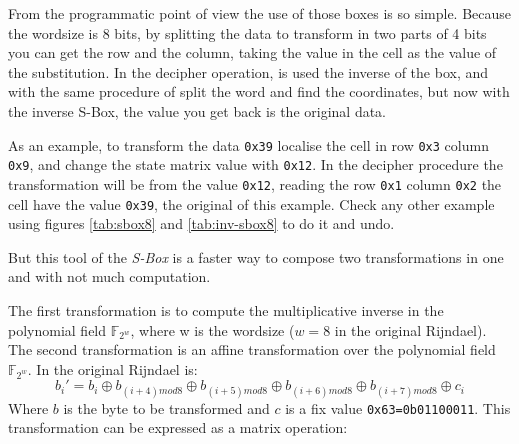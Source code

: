 \documentclass[10pt,a4paper,twoside]{llncs}
\newcommand{\Fpn}[2]{\ensuremath{\mathbb{F}_{#1^#2}}}
\begin{document}
From the programmatic point of view the use of those boxes is so simple. Because the wordsize is 8 bits, by splitting the data to transform in two parts of 4 bits you can get the row and the column, taking the value in the cell as the value of the substitution. In the decipher operation, is used the inverse of the box, and with the same procedure of split the word and find the coordinates, but now with the inverse S-Box, the value you get back is the original data.

As an example, to transform the data \texttt{0x39} localise the cell in row \texttt{0x3} column \texttt{0x9}, and change the state matrix value with \texttt{0x12}. In the decipher procedure the transformation will be from the value \texttt{0x12}, reading the row \texttt{0x1} column \texttt{0x2} the cell have the value \texttt{0x39}, the original of this example. Check any other example using figures \ref{tab:sbox8} and \ref{tab:inv-sbox8} to do it and undo.


But this tool of the \emph{S-Box} is a faster way to compose two transformations in one and with not much computation.

The first transformation is to compute the multiplicative inverse in the polynomial field \Fpn{2}{w}, where w is the wordsize ($w=8$ in the original Rijndael). The second transformation is an affine transformation over the polynomial field \Fpn{2}{w}. In the original Rijndael is:
\begin{equation}\label{eq:subBytes:affine}
 b_{i}' = b_{i} \oplus b_{(i+4)mod8} \oplus b_{(i+5)mod8} \oplus 
          b_{(i+6)mod8} \oplus b_{(i+7)mod8} \oplus c_{i}
\end{equation}
Where $b$ is the byte to be transformed and $c$ is a fix value \texttt{0x63=0b01100011}. This transformation can be expressed as a matrix operation:
\end{document}
